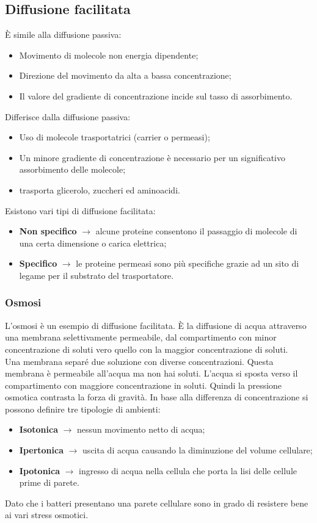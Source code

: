 \subsection{Diffusione facilitata}
\`E simile alla diffusione passiva:
\begin{itemize}
    \item Movimento di molecole non energia dipendente; 
    \item Direzione del movimento da alta a bassa concentrazione; 
    \item Il valore del gradiente di concentrazione incide sul tasso di assorbimento.
\end{itemize}
Differisce dalla diffusione passiva:
\begin{itemize}
    \item Uso di molecole trasportatrici (carrier o permeasi); 
    \item Un minore gradiente di concentrazione \`e necessario per un significativo assorbimento delle molecole; 
    \item trasporta glicerolo, zuccheri ed aminoacidi.
\end{itemize}
Esistono vari tipi di diffusione facilitata:
\begin{itemize}
    \item \textbf{Non specifico} $\xrightarrow{}$ alcune proteine consentono il passaggio di molecole di una certa dimensione o carica elettrica; 
    \item \textbf{Specifico} $\xrightarrow{}$ le proteine permeasi sono pi\`u specifiche grazie ad un sito di legame per il substrato del trasportatore.
\end{itemize}
\subsubsection{Osmosi}
L'osmosi \`e un esempio di diffusione facilitata. \`E la diffusione di acqua attraverso una membrana selettivamente permeabile, dal compartimento con minor concentrazione di soluti vero quello con la maggior concentrazione di soluti. 
\\Una membrana separé due soluzione con diverse concentrazioni. Questa membrana \`e permeabile all'acqua ma non hai soluti. L'acqua si sposta verso il compartimento con maggiore concentrazione in soluti. Quindi la pressione osmotica contrasta la forza di gravit\`a.
In base alla differenza di concentrazione si possono definire tre tipologie di ambienti: 
\begin{itemize}
    \item \textbf{Isotonica} $\xrightarrow{}$ nessun movimento netto di acqua; 
    \item \textbf{Ipertonica} $\xrightarrow{}$ uscita di acqua causando la diminuzione del volume cellulare; 
    \item \textbf{Ipotonica} $\xrightarrow{}$ ingresso di acqua nella cellula che porta la lisi delle cellule prime di parete.
\end{itemize}
Dato che i batteri presentano una parete cellulare sono in grado di resistere bene ai vari stress osmotici.
